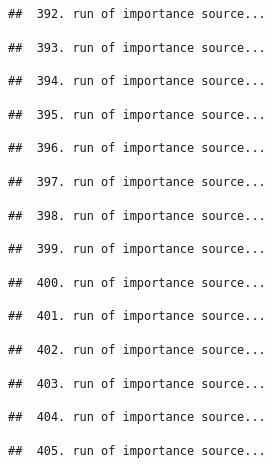 \documentclass[
]{article}
\begin{document}
\begin{verbatim}
##  392. run of importance source...
\end{verbatim}

\begin{verbatim}
##  393. run of importance source...
\end{verbatim}

\begin{verbatim}
##  394. run of importance source...
\end{verbatim}

\begin{verbatim}
##  395. run of importance source...
\end{verbatim}

\begin{verbatim}
##  396. run of importance source...
\end{verbatim}

\begin{verbatim}
##  397. run of importance source...
\end{verbatim}

\begin{verbatim}
##  398. run of importance source...
\end{verbatim}

\begin{verbatim}
##  399. run of importance source...
\end{verbatim}

\begin{verbatim}
##  400. run of importance source...
\end{verbatim}

\begin{verbatim}
##  401. run of importance source...
\end{verbatim}

\begin{verbatim}
##  402. run of importance source...
\end{verbatim}

\begin{verbatim}
##  403. run of importance source...
\end{verbatim}

\begin{verbatim}
##  404. run of importance source...
\end{verbatim}

\begin{verbatim}
##  405. run of importance source...
\end{verbatim}
\end{document}
